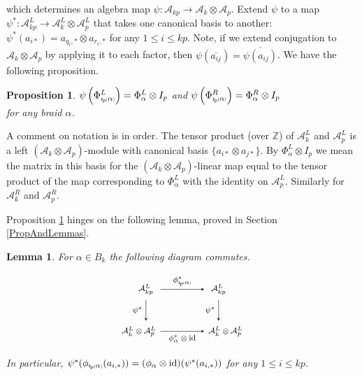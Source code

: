 \documentclass[11pt]{amsart}
\def\Z{{\mathbb Z}}
\def\A{{\mathcal A}}
\newcommand*{\subsmallp}[1]{\scalebox{.5}{\ensuremath#1}}
\newcommand{\subpp}[2][p]{\imath_{\hspace*{-1pt}#1}\hspace*{-.5pt}\subsmallp(#2\subsmallp)}
\newcommand\id{\operatorname{id}}
\newtheorem{lem}[thm]{Lemma}
\newtheorem{prop}[thm]{Proposition}
\theoremstyle{definition}
\begin{document}
\noindent which determines an algebra map $\psi\colon \A_{kp} \rightarrow \A_k\otimes \A_p$. Extend $\psi$ to a map $\psi^\ast:\A_{kp}^L\to\A_k^L\otimes\A_p^L$ that takes one canonical basis to another: $\psi^\ast(a_{i\ast}) = a_{q_i,\ast}\otimes a_{r_i,\ast}$ for any $1\le i\le kp$. Note, if we extend conjugation to $\A_k\otimes\A_p$ by applying it to each factor, then $\psi(\overline{a_{ij}}) = \overline{\psi(a_{ij})}$. We have the following proposition.

\begin{prop}\label{psiofbp}
$\psi\left(\Phi_{\subpp\alpha}^L\right) = \Phi_\alpha^L\otimes I_p$ and $\psi\left(\Phi_{\subpp\alpha}^R\right) = \Phi_\alpha^R\otimes I_p$\\
for any braid $\alpha$.
\end{prop}

A comment on notation is in order. The tensor product (over $\Z$) of $\A_k^L$ and $\A_p^L$ is a left $(\A_k\otimes\A_p)$-module with canonical basis $\{a_{i\ast}\otimes a_{j\ast}\}$. By $\Phi_\alpha^L\otimes I_p$ we mean the matrix in this basis for the $(\A_k\otimes\A_p)$-linear map equal to the tensor product of the map corresponding to $\Phi_\alpha^L$ with the identity on $\A_p^L$. Similarly for $\A_k^R$ and $\A_p^R$.

Proposition \ref{psiofbp} hinges on the following lemma, proved in Section \ref{PropAndLemmas}.

\begin{lem}\label{commutes} For $\alpha\in B_k$ the following diagram commutes.

  \[\begin{tikzpicture}[scale=.75,>=stealth]
    \foreach \m in {0,3.5}
      \draw (\m,2) node {\footnotesize $\A_{kp}^L$};
    \draw (.65,0) node[left] {\footnotesize $\A_k^L\otimes\A_p^L$}
          (2.85,0) node[right] {\footnotesize $\A_k^L\otimes\A_p^L$};
    \draw[->] (.7,2) -- node[above] {\footnotesize $\phi_{\subpp\alpha}^\ast$} (2.8,2);
    \draw[->] (.7,0) -- node[below] {\footnotesize $\phi_\alpha^\ast\otimes\id$} (2.8,0);
    \foreach \p in {0,3.5}
      \draw[->] (\p,1.5) -- node[left] {\footnotesize $\psi^\ast$} (\p,.5);
  \end{tikzpicture}\]

\noindent In particular, $\psi^\ast(\phi_{\subpp\alpha}(a_{i,\ast})) = (\phi_{\alpha} \otimes \id)(\psi^\ast(a_{i,\ast}))$ for any $1\le i\le kp$.
\end{lem}
\end{document}
